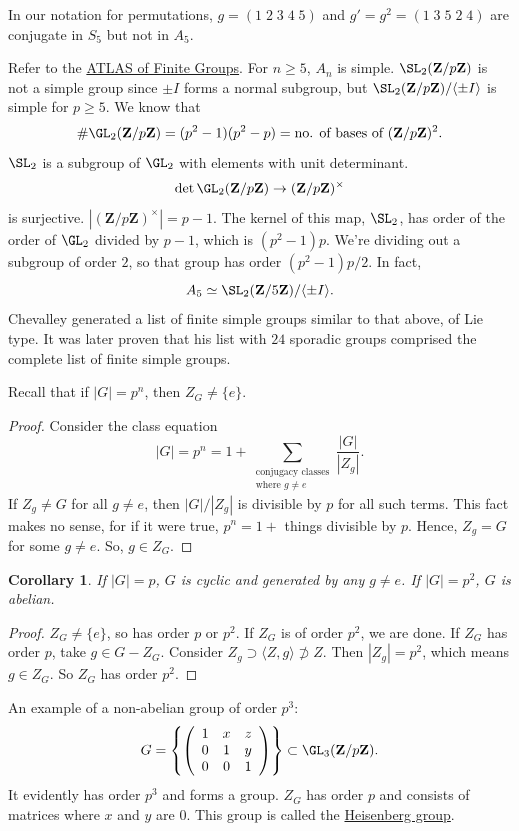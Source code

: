 \documentclass[11pt, oneside]{amsart}
\numberwithin{equation}{section}
\numberwithin{theorem}{section}
\newtheorem{corollary}[theorem]{Corollary}
\theoremstyle{definition}
\def\Z{\mathbf{Z}}
\def\0{\mathbf{0}}
\begin{document}
{In our notation for permutations, $g = (1\;2\;3\;4\;5)$ and $g' = g^2 = (1\;3\;5\;2\;4)$ are conjugate in $S_5$ but not in $A_5$.

Refer to the \underline{ATLAS of Finite Groups}. For $n\geqslant 5$, $A_n$ is simple. $\SL_2(\Z/p\Z)$ is not a simple group since $\pm I$ forms a normal subgroup, but $\SL_2(\Z/p\Z)/\langle \pm I\rangle$ is simple for $p\geqslant 5$. We know that 
$$
\# \GL_2(\Z/p\Z) = (p^2-1)(p^2-p) = \textrm{no. of bases of $(\Z/p\Z)^2$}.
$$
$\SL_2$ is a subgroup of $\GL_2$ with elements with unit determinant. 
$$
\det \GL_2(\Z/p\Z) \to (\Z/p\Z)^\times
$$
is surjective. $|(\Z/p\Z)^\times| = p-1$. The kernel of this map, $\SL_2$, has order of the order of $\GL_2$ divided by $p-1$, which is $(p^2-1)p$. We're dividing out a subgroup of order $2$, so that group has order $(p^2-1)p/2$. In fact,
$$
A_5\simeq \SL_2(\Z/5\Z)/\langle \pm I\rangle.
$$
Chevalley generated a list of finite simple groups similar to that above, of Lie type. It was later proven that his list with $24$ sporadic groups comprised the complete list of finite simple groups.

Recall that if $ |G| = p^n$, then $Z_G \neq \{e\}$. 
\begin{proof}
Consider the class equation 
$$
|G| = p^n = 1 + \sum_{\substack{\textrm{conjugacy classes}\\\textrm{where } g\neq e}} \frac{|G|}{|Z_g|}.
$$
If $Z_g \neq G$ for all $g\neq e$, then $|G|/|Z_g|$ is divisible by $p$ for all such terms. This fact makes no sense, for if it were true, $p^n= 1 +$ things divisible by $p$. Hence, $Z_g = G$ for some $g\neq e$. So, $g\in Z_G$.
\end{proof}

\begin{corollary}
If $|G| = p$, $G$ is cyclic and generated by any $g\neq e$. If $|G| = p^2$, $G$ is abelian. 
\end{corollary}
\begin{proof}
$Z_G\neq \{e\}$, so has order $p$ or $p^2$. If $Z_G$ is of order $p^2$, we are done. If $Z_G$ has order $p$, take $g\in G-Z_G$. Consider $Z_g\supset \langle Z, g\rangle \not\supset Z$. Then $|Z_g| = p^2$, which means $g\in Z_G$. So $Z_G$ has order $p^2$. 
\end{proof}
An example of a non-abelian group of order $p^3$:
$$
G =\left\{ \left(\begin{array}{ccc} 1 &x&z\\ 0& 1&y\\0&0&1\end{array}\right) \right\} \subset \GL_3(\Z/p\Z).
$$
It evidently has order $p^3$ and forms a group. $Z_G$ has order $p$ and consists of matrices where $x$ and $y$ are 0. This group is called the \underline{Heisenberg group}.

}
\end{document}
